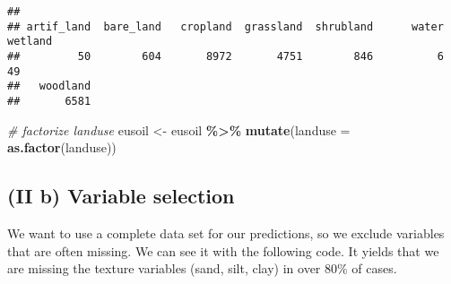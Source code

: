 \documentclass[
]{article}
\newenvironment{Shaded}{\begin{snugshade}}{\end{snugshade}}
\newcommand{\CommentTok}[1]{\textcolor[rgb]{0.56,0.35,0.01}{\textit{#1}}}
\newcommand{\ControlFlowTok}[1]{\textcolor[rgb]{0.13,0.29,0.53}{\textbf{#1}}}
\newcommand{\DataTypeTok}[1]{\textcolor[rgb]{0.13,0.29,0.53}{#1}}
\newcommand{\DecValTok}[1]{\textcolor[rgb]{0.00,0.00,0.81}{#1}}
\newcommand{\KeywordTok}[1]{\textcolor[rgb]{0.13,0.29,0.53}{\textbf{#1}}}
\newcommand{\NormalTok}[1]{#1}
\newcommand{\OperatorTok}[1]{\textcolor[rgb]{0.81,0.36,0.00}{\textbf{#1}}}
\newcommand{\StringTok}[1]{\textcolor[rgb]{0.31,0.60,0.02}{#1}}
\begin{document}
\begin{verbatim}
## 
## artif_land  bare_land   cropland  grassland  shrubland      water    wetland 
##         50        604       8972       4751        846          6         49 
##   woodland 
##       6581
\end{verbatim}

\begin{Shaded}
\begin{Highlighting}[]
\CommentTok{\# factorize landuse}
\NormalTok{eusoil <{-}}\StringTok{ }\NormalTok{eusoil }\OperatorTok{\%>\%}\StringTok{ }\KeywordTok{mutate}\NormalTok{(}\DataTypeTok{landuse =} \KeywordTok{as.factor}\NormalTok{(landuse))}
\end{Highlighting}
\end{Shaded}

\hypertarget{ii-b-variable-selection}{%
\subsection{(II b) Variable selection}\label{ii-b-variable-selection}}

We want to use a complete data set for our predictions, so we exclude
variables that are often missing. We can see it with the following code.
It yields that we are missing the texture variables (sand, silt, clay)
in over 80\% of cases.

\begin{Shaded}
\end{Shaded}
\end{document}
